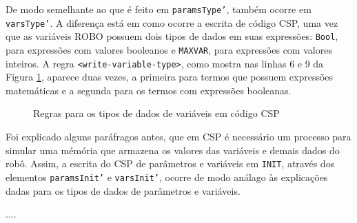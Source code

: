 De modo semelhante ao que é feito em \texttt{paramsType'}, também ocorre em \texttt{vars\-Type'}. A diferença está em como ocorre a escrita de código CSP, uma vez que as variáveis ROBO possuem dois tipos de dados em suas expressões: \texttt{Bool}, para expressões com valores booleanos e \texttt{MAXVAR}, para expressões com valores inteiros. A regra \texttt{<write-variable-type>}, como mostra nas linhas 6 e 9 da Figura \ref{fig:rules_var_type}, aparece duas vezes, a primeira para termos que possuem expressões matemáticas e a segunda para os termos com expressões booleanas.

\begin{figure}[h]
\centering
\caption{Regras para os tipos de dados de variáveis em código CSP}

\label{fig:rules_var_type}
\end{figure}

Foi explicado alguns paráfragos antes, que em CSP é necessário um processo para simular uma mémória que armazena os valores das variáveis e demais dados do robô. Assim, a escrita do CSP de parâmetros e variáveis em \texttt{INIT}, através dos elementos \texttt{paramsInit'} e \texttt{varsInit'}, ocorre de modo análago às explicações dadas para os tipos de dados de parâmetros e variáveis.



....


